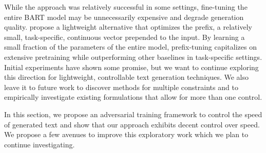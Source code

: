 While the approach was relatively successful in some settings, fine-tuning the entire BART model may be unnecessarily expensive and degrade generation quality. \citet{li2021prefix} propose a lightweight alternative that optimizes the prefix, a relatively small, task-specific, continuous vector prepended to the input. By learning a small fraction of the parameters of the entire model, prefix-tuning capitalizes on extensive pretraining while outperforming other baselines in task-specific settings. Initial experiments have shown some promise, but we want to continue exploring this direction for lightweight, controllable text generation techniques. We also leave it to future work to discover methods for multiple constraints and to empirically investigate existing formulations that allow for more than one control.

In this section, we propose an adversarial training framework to control the speed of generated text and show that our approach exhibits decent control over speed. We propose a few avenues to improve this exploratory work which we plan to continue investigating.
